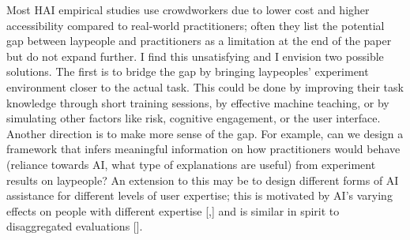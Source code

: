 Most HAI empirical studies use crowdworkers due to lower cost and higher accessibility compared to real-world practitioners; often they list the potential gap between laypeople and practitioners as a limitation at the end of the paper but do not expand further. I find this unsatisfying and I envision two possible solutions. The first is to bridge the gap by bringing laypeoples’ experiment environment closer to the actual task. This could be done by improving their task knowledge through short training sessions, by effective machine teaching, or by simulating other factors like risk, cognitive engagement, or the user interface. Another direction is to make more sense of the gap. For example, can we design a framework that infers meaningful information on how practitioners would behave (reliance towards AI, what type of explanations are useful) from experiment results on laypeople? An extension to this may be to design different forms of AI assistance for different levels of user expertise; this is motivated by AI's varying effects on people with different expertise [,] and is similar in spirit to disaggregated evaluations [].


















